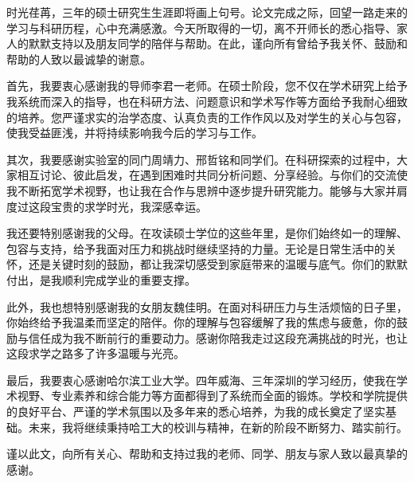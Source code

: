 

\begin{acknowledgements}
时光荏苒，三年的硕士研究生生涯即将画上句号。论文完成之际，回望一路走来的学习与科研历程，心中充满感激。今天所取得的一切，离不开师长的悉心指导、家人的默默支持以及朋友同学的陪伴与帮助。在此，谨向所有曾给予我关怀、鼓励和帮助的人致以最诚挚的谢意。

首先，我要衷心感谢我的导师李君一老师。在硕士阶段，您不仅在学术研究上给予我系统而深入的指导，也在科研方法、问题意识和学术写作等方面给予我耐心细致的培养。您严谨求实的治学态度、认真负责的工作作风以及对学生的关心与包容，使我受益匪浅，并将持续影响我今后的学习与工作。

其次，我要感谢实验室的同门周靖力、邢哲铭和同学们。在科研探索的过程中，大家相互讨论、彼此启发，在遇到困难时共同分析问题、分享经验。与你们的交流使我不断拓宽学术视野，也让我在合作与思辨中逐步提升研究能力。能够与大家并肩度过这段宝贵的求学时光，我深感幸运。

我还要特别感谢我的父母。在攻读硕士学位的这些年里，是你们始终如一的理解、包容与支持，给予我面对压力和挑战时继续坚持的力量。无论是日常生活中的关怀，还是关键时刻的鼓励，都让我深切感受到家庭带来的温暖与底气。你们的默默付出，是我顺利完成学业的重要支撑。

此外，我也想特别感谢我的女朋友魏佳明。在面对科研压力与生活烦恼的日子里，你始终给予我温柔而坚定的陪伴。你的理解与包容缓解了我的焦虑与疲惫，你的鼓励与信任成为我不断前行的重要动力。感谢你陪我走过这段充满挑战的时光，也让这段求学之路多了许多温暖与光亮。

最后，我要衷心感谢哈尔滨工业大学。四年威海、三年深圳的学习经历，使我在学术视野、专业素养和综合能力等方面都得到了系统而全面的锻炼。学校和学院提供的良好平台、严谨的学术氛围以及多年来的悉心培养，为我的成长奠定了坚实基础。未来，我将继续秉持哈工大的校训与精神，在新的阶段不断努力、踏实前行。

谨以此文，向所有关心、帮助和支持过我的老师、同学、朋友与家人致以最真挚的感谢。

\end{acknowledgements}
